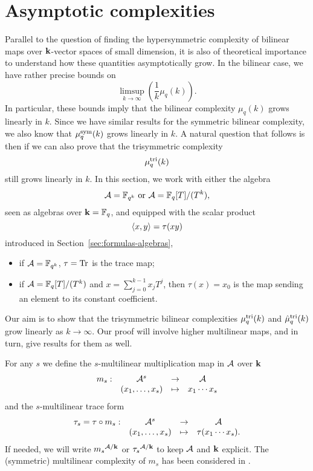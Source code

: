 \section{Asymptotic complexities}
\label{sec:asymptotic}

Parallel to the question of finding the hypersymmetric complexity of bilinear
maps over $\mathbf{k}$-vector spaces of small dimension, it is also of theoretical
importance to understand how these quantities asymptotically grow. In the
bilinear case, we have rather precise bounds on
\[
  \limsup_{k\to\infty}(\frac{1}{k}\mu_q(k)).
\]
In particular, these bounds imply that the bilinear complexity $\mu_q(k)$ grows
linearly in $k$. Since we have similar results for the symmetric bilinear
complexity, we also know that $\mu^{\textrm{sym}}_q(k)$ grows linearly in $k$. A natural
question that follows is then if we can also prove that the trisymmetric
complexity
\[
  \mu^{\textrm{tri}}_q(k)
\]
still grows linearly in $k$. In this section, we work with either the algebra 
\[
  \mathcal{A}=\mathbb{F}_{q^k}\text{ or }\mathcal{A}=\mathbb{F}_q[T]/(T^k),
\]
seen as algebras over $\mathbf{k}=\mathbb{F}_q$, and
equipped with the scalar product 
\[
  \left\langle x,y\right\rangle = \tau(xy)
\]
introduced in
Section~\ref{sec:formulas-algebras}, \ie
\begin{itemize}
  \item if $\mathcal{A}=\mathbb{F}_{q^k}$, $\tau=\operatorname{Tr}$ is the trace map;
  \item if $\mathcal{A} = \mathbb{F}_{q}[T]/(T^k)$ and $x=\sum_{j=0}^{k-1}x_jT^j$, then
    $\tau(x) = x_0$ is the map sending an element to its constant coefficient.
\end{itemize}
Our aim is to show that the trisymmetric bilinear complexities $\mu^{\textrm{tri}}_q(k)$ and $\hat\mu^{\textrm{tri}}_q(k)$ grow linearly as $k\to\infty$.
Our proof will involve higher multilinear maps, and in turn, give results for them as well.

For any $s$ we define the $s$-multilinear multiplication map in $\mathcal{A}$ over $\mathbf{k}$
\[
\begin{array}{cccc}
m_s:&\mathcal{A}^s&\to&\mathcal{A}\\
&(x_1,\dots,x_s)&\mapsto&x_1\cdots x_s
\end{array}
\]
and the $s$-multilinear trace form
\[
\begin{array}{cccc}
\tau_s=\tau\circ m_s:&\mathcal{A}^s&\to&\mathcal{A}\\
&(x_1,\dots,x_s)&\mapsto&\tau(x_1\cdots x_s).
\end{array}
\]
If needed, we will write ${m_s}^{\mathcal{A}/\mathbf{k}}$ or ${\tau_s}^{\mathcal{A}/\mathbf{k}}$ to keep $\mathcal{A}$ and $\mathbf{k}$ explicit. 
The (symmetric) multilinear complexity of $m_s$ has been considered in
\cite{Bshouty13}.

